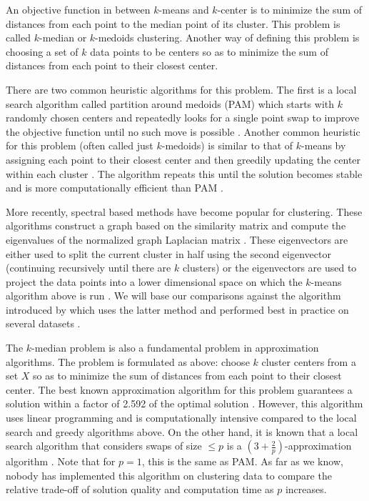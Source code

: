 \documentclass{article}
\begin{document}
An objective function in between $k$-means and $k$-center is to minimize the sum of distances from each point to the median point of its cluster. This problem is called $k$-median or $k$-medoids clustering. Another way of defining this problem is choosing a set of $k$ data points to be centers so as to minimize the sum of distances from each point to their closest center. 

There are two common heuristic algorithms for this problem. The first is a local search algorithm called partition around medoids (PAM) which starts with $k$ randomly chosen centers and repeatedly looks for a single point swap to improve the objective function until no such move is possible \cite{ESL}. 
Another common heuristic for this problem (often called just $k$-medoids) is similar to that of $k$-means by assigning each point to their closest center and then greedily updating the center within each cluster \cite{Park}. The algorithm repeats this until the solution becomes stable and is more computationally efficient than PAM \cite{Park}.  

More recently, spectral based methods have become popular for clustering. These algorithms construct a graph based on the similarity matrix and compute the eigenvalues of the normalized graph Laplacian matrix \cite{Luxburg}. These eigenvectors are either used to split the current cluster in half using the second eigenvector (continuing recursively until there are $k$ clusters) or the eigenvectors are used to project the data points into a lower dimensional space on which the $k$-means algorithm above is run \cite{Verma}. We will base our comparisons against the algorithm introduced by \cite{Meila} which uses the latter method and performed best in practice on several datasets \cite{Verma}.

The $k$-median problem is also a fundamental problem in approximation algorithms. The problem is formulated as above: choose $k$ cluster centers from a set $X$ so as to minimize the sum of distances from each point to their closest center. The best known approximation algorithm for this problem guarantees a solution within a factor of 2.592 of the optimal solution \cite{Wu}. However, this algorithm uses linear programming and is computationally intensive compared to the local search and greedy algorithms above. On the other hand, it is known that a local search algorithm that considers swaps of size $\leq p$ is a $(3 + \frac{2}{p})$-approximation algorithm \cite{Arya}. Note that for $p=1$, this is the same as PAM. As far as we know, nobody has implemented this algorithm on clustering data to compare the relative trade-off of solution quality and computation time as $p$ increases.  
\end{document}
